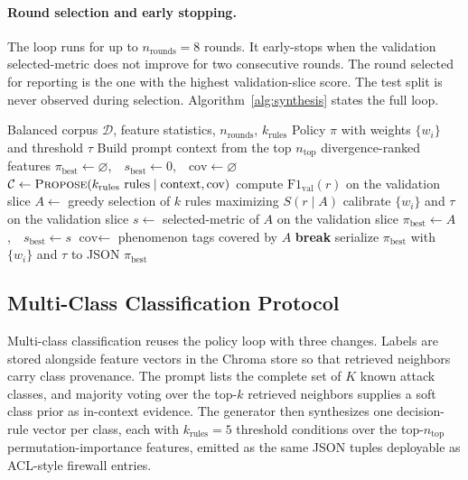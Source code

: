 \paragraph{Round selection and early stopping.}
The loop runs for up to $n_{\text{rounds}} = 8$ rounds. It early-stops when the
validation selected-metric does not improve for two consecutive rounds. The
round selected for reporting is the one with the highest validation-slice
score. The test split is never observed during selection. Algorithm~\ref{alg:synthesis}
states the full loop.

\begin{algorithm}[t]
\caption{Offline Policy Synthesis}
\label{alg:synthesis}
\begin{algorithmic}[1]
\Require Balanced corpus $\mathcal{D}$, feature statistics, $n_{\text{rounds}}$, $k_{\text{rules}}$
\Ensure Policy $\pi$ with weights $\{w_i\}$ and threshold $\tau$
\State Build prompt context from the top $n_{\text{top}}$ divergence-ranked features
\State $\pi_{\text{best}} \gets \varnothing$,\ \ $s_{\text{best}} \gets 0$,\ \ $\text{cov} \gets \varnothing$
  \State $\mathcal{C} \gets \textsc{Propose}(k_{\text{rules}}\ \text{rules} \mid \text{context}, \text{cov})$
    \State compute $\mathrm{F1}_{\text{val}}(r)$ on the validation slice
  \EndFor
  \State $A \gets$ greedy selection of $k$ rules maximizing $S(r \mid A)$
  \State calibrate $\{w_i\}$ and $\tau$ on the validation slice
  \State $s \gets$ selected-metric of $A$ on the validation slice
    \State $\pi_{\text{best}} \gets A$,\ \ $s_{\text{best}} \gets s$
  \EndIf
  \State $\text{cov} \gets$ phenomenon tags covered by $A$
    \State \textbf{break}
  \EndIf
\EndFor
\State serialize $\pi_{\text{best}}$ with $\{w_i\}$ and $\tau$ to JSON
\State \Return $\pi_{\text{best}}$
\end{algorithmic}
\end{algorithm}

\subsection{Multi-Class Classification Protocol}
\label{subsec:multiclass}

Multi-class classification reuses the policy loop with three changes. Labels
are stored alongside feature vectors in the Chroma store so that retrieved
neighbors carry class provenance. The prompt lists the complete set of $K$
known attack classes, and majority voting over the top-$k$ retrieved neighbors
supplies a soft class prior as in-context evidence. The generator then
synthesizes one decision-rule vector per class, each with $k_{\text{rules}}=5$
threshold conditions over the top-$n_{\text{top}}$ permutation-importance
features, emitted as the same JSON tuples deployable as ACL-style firewall
entries.

